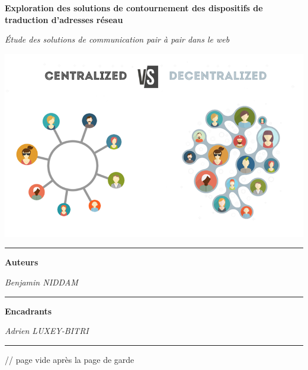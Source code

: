 \begin{titlepage}
    \begin{center}
        \vspace*{\fill}

        \textbf{\huge{Exploration des solutions de contournement des dispositifs de traduction d'adresses réseau}}\\

        \vspace{0.5cm}

        \textsl{\large{Étude des solutions de communication pair à pair dans le web}}\\

        \vspace{2cm}

        \includegraphics[scale=0.5]{./assets/logo.png}

        \vspace{2cm}

        \rule{\linewidth}{0.15mm}
        \textbf{Auteurs}

        \vspace{0.3cm}

        \small{\textit{Benjamin NIDDAM}} \\
        \rule{\linewidth}{0.15mm}
        \textbf{Encadrants}

        \vspace{0.3cm}

        \small{\textit{Adrien LUXEY-BITRI}} \\
        \rule{\linewidth}{0.15mm}

        \vspace{2cm}

        \vfill
        \date{13 juin 2023}
    \end{center}
    \vspace*{\fill} // page vide après la page de garde
\end{titlepage}